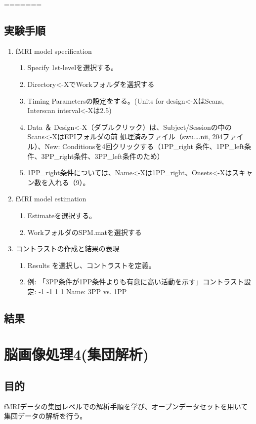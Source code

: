 \documentclass{jlreq}
\begin{document}
=======
\subsection{実験手順}
\begin{enumerate}
    \item fMRI model specification
    \begin{enumerate}
        \item Specify 1st-levelを選択する。
        \item Directory<-XでWorkフォルダを選択する
        \item Timing Parametersの設定をする。(Units for design<-XはScans, Interscan interval<-Xは2.5)
        \item Data ＆ Design<-X（ダブルクリック）は、Subject/Sessionの中のScans<-XはEPIフォルダの前
処理済みファイル（swu….nii, 204ファイル）、New: Conditionsを4回クリックする（1PP\_right
条件、1PP\_left条件、3PP\_right条件、3PP\_left条件のため）
        \item 1PP\_right条件については、Name<-Xは1PP\_right、Onsets<-Xはスキャン数を入れる（9）。
    \end{enumerate}

    \item fMRI model estimation
    \begin{enumerate}
        \item Estimateを選択する。
        \item WorkフォルダのSPM.matを選択する
    \end{enumerate}

    \item コントラストの作成と結果の表現
    \begin{enumerate}
        \item Results を選択し、コントラストを定義。
        \item 例: 「3PP条件が1PP条件よりも有意に高い活動を示す」コントラスト設定: -1 -1 1 1 Name: 3PP vs. 1PP
    \end{enumerate}
\end{enumerate}

\subsection{結果}

\section{脳画像処理4(集団解析)}
\subsection{目的}
fMRIデータの集団レベルでの解析手順を学び、オープンデータセットを用いて集団データの解析を行う。
\end{document}
